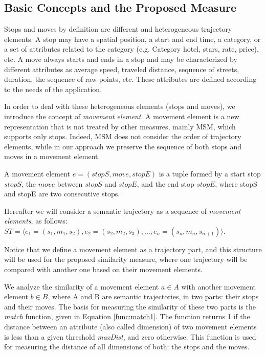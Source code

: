 \subsection{Basic Concepts and the Proposed Measure}

Stops and moves by definition are different and heterogeneous trajectory elements. A stop may have a spatial position, a start and end time, a category, or a set of attributes related to the category (e.g. Category hotel, stars, rate, price), etc. A move always starts and ends in a stop and may be characterized by different attributes as average speed, traveled distance, sequence of streets, duration, the sequence of raw points, etc. These attributes are defined according to the needs of the application. 

In order to deal with these heterogeneous elements (stops and moves), we introduce the concept of \emph{movement element}. A movement element is a new representation that is not treated by other measures, mainly MSM, which supports only stops. Indeed, MSM does not consider the order of trajectory elements, while in our approach we preserve the sequence of both stops and moves in a movement element.

\begin{definition}
\label{def:movement_element}
A movement element  $e=(stopS, move, stopE)$ is a tuple formed by a start stop $stopS$, the $move$ between $stopS$ and  $stopE$, and the end stop $stopE$, where stopS and stopE are two consecutive stops.
\end{definition}


Hereafter we will consider a semantic trajectory as a sequence of \textit{movement elements}, as follows: 
$ST=\langle e_1=(s_1,m_1,s_2), e_2=(s_2,m_2,s_3), ..., e_n=(s_n,m_n,s_{n+1}) \rangle$.

Notice that we define a movement element as a trajectory part, and this structure will be used for the proposed similarity measure, where one trajectory will be compared with another one based on their movement elements.



We analyze the similarity of a movement element $a\in A$ with another movement element $b\in B$, where A and B are semantic trajectories, in two parts: their stops and their moves. The basis for measuring the similarity of these two parts is the \emph{match} function, given in Equation \ref{func:match1}. The function returns 1 if the distance between an attribute (also called dimension) of two movement elements is less than a given threshold \emph{maxDist}, and zero otherwise. This function is used for measuring the distance of all dimensions of both: the stops and the moves.


